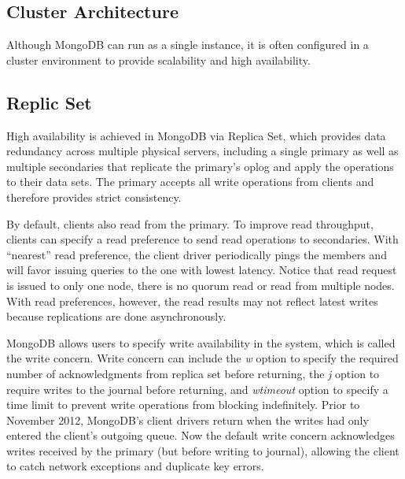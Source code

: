 \documentclass[11pt]{book}
\begin{document}
\subsection{Cluster Architecture}

Although MongoDB can run as a single instance, it is often configured in a cluster environment to provide scalability and high availability.

\subsection{Replic Set}
High availability is achieved in MongoDB via Replica Set, which provides data redundancy across multiple physical servers, including a single primary as well as multiple secondaries that replicate the primary's oplog and apply the operations to their data sets. The primary accepts all write operations from clients and therefore provides strict consistency. 

By default, clients also read from the primary. To improve read throughput, clients can specify a read preference to send read operations to secondaries. With ``nearest'' read preference, the client driver periodically pings the members and will favor issuing queries to the one with lowest latency. Notice that read request is issued to only one node, there is no quorum read or read from multiple nodes. With read preferences, however, the read results may not reflect latest writes because replications are done asynchronously. 

MongoDB allows users to specify write availability in the system, which is called the write concern. Write concern can include the {\em w} option to specify the required number of acknowledgments from replica set before returning, the {\em j} option to require writes to the journal before returning, and {\em wtimeout} option to specify a time limit to prevent write operations from blocking indefinitely. Prior to November 2012, MongoDB's client drivers return when the writes had only entered the client's outgoing queue. Now the default write concern acknowledges writes received by the primary (but before writing to journal), allowing the client to catch network exceptions and duplicate key errors. 
\end{document}
